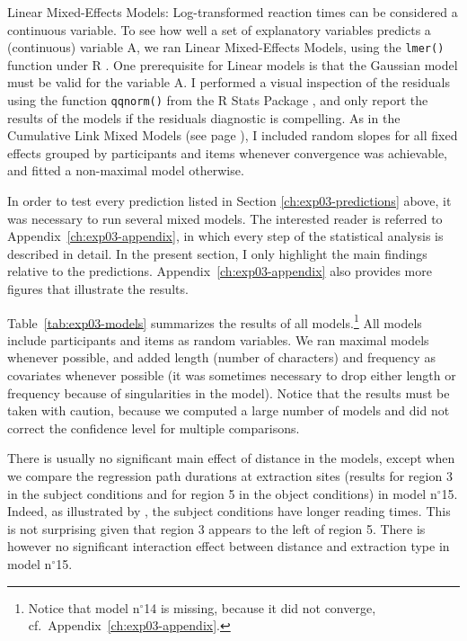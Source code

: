 Linear Mixed-Effects Models:
\label{ch:linear-models}
Log-transformed reaction times can be considered a continuous variable.  
To see how well a set of explanatory variables predicts a (continuous) variable A, we ran Linear Mixed-Effects Models, using the \texttt{lmer()} function under R \citep{R}. One prerequisite for Linear models is that the Gaussian model must be valid for the variable A. I performed a visual inspection of the residuals using the function \texttt{qqnorm()} from the R Stats Package \citep{R}, and only report the results of the models if the residuals diagnostic is compelling.
As in the Cumulative Link Mixed Models (see page \pageref{ch:cumulative-link-model}), I included random slopes for all fixed effects grouped by participants and items whenever convergence was achievable, and fitted a non-maximal model otherwise.


In order to test every prediction listed in Section \ref{ch:exp03-predictions} above, it was necessary to run several mixed models. The interested reader is referred to Appendix~\ref{ch:exp03-appendix}, in which every step of the statistical analysis is described in detail. In the present section, I only highlight the main findings relative to the predictions. Appendix~\ref{ch:exp03-appendix} also provides more figures that illustrate the results.

Table~\ref{tab:exp03-models} summarizes the results of all models.\footnote{Notice that model n$^{\circ}$14 is missing, because it did not converge, cf.\ Appendix~\ref{ch:exp03-appendix}.} All models include participants and items as random variables. We ran maximal models whenever possible, and added length (number of characters) and frequency as covariates whenever possible (it was sometimes necessary to drop either length or frequency because of singularities in the model). Notice that the results must be taken with caution, because we computed a large number of models and did not correct the confidence level for multiple comparisons. 



There is usually no significant main effect of distance in the models, except when we compare the regression path durations at extraction sites (results for region 3 in the subject conditions and for region 5 in the object conditions) in model n$^{\circ}$15. Indeed, as illustrated by , the subject conditions have longer reading times. This is not surprising given that region 3 appears to the left of region 5. There is however no significant interaction effect between distance and extraction type in model n$^{\circ}$15. 

